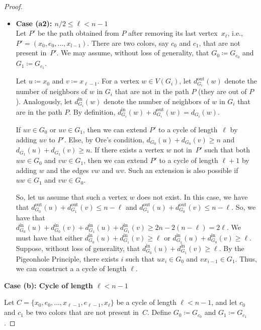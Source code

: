 \begin{proof}
\begin{itemize}
\item[] \textbf{Case (a2): \( n/2 \leq \ell < n-1 \)} \\ 


Let $P'$ be the path obtained from $P$ after removing its last vertex~$x_\ell$, i.e., $P' = (x_0, e_0, \dots, x_{l-1})$. There are two colors, say $c_0$ and $c_1$, that are not present
in~$P'$. We may assume, without loss of generality, that
\(G_0 \coloneqq G_{c_0}\) and \(G_1 \coloneqq G_{c_1}\).

Let
\(u \coloneqq x_0\) and \( v \coloneqq x_{\ell-1}\). 
% 
For a vertex $w\in V(G_i)$, let \( d^{\text{out}}_{G_i}(w)\) denote
the number of neighbors of \(w\) in $G_i$ that are not in the path $P$
(they are out of $P$).  Analogously, let \(d^{\text{in}}_{G_i}(w) \)
denote the number of neighbors of \(w\) in $G_i$ that are in the path
$P$.
%
By definition, \( d^{\text{in}}_{G_i}(w) + d^{\text{out}}_{G_i}(w) = d_{G_i}(w) \).

If \(uv \in G_0 \) or \( uv \in G_1 \), then we can extend $P'$ to a cycle of length~\( \ell \)
by adding $uv$ to $P'$.  Else, by Ore's condition, \( d_{G_0}(u) + d_{G_0}(v) \geq n \) and \( d_{G_1}(u) + d_{G_1}(v) \geq n \).
If there exists a vertex \(w\) not in~$P'$ such that both \(uw \in G_0 \) and \(vw \in G_1 \), 
then we can extend $P'$ to a  cycle of length \( \ell + 1 \) by adding $w$ and the edges $vw$ and $wv$.
Such an extension is also possible if \( uw \in G_1 \) and \( vw \in G_0 \).


So, let us assume that such a vertex \(w\) does not exist. In this case, we have that 
\( d^{\text{out}}_{G_0}(u) + d^{\text{out}}_{G_1}(v) \leq n - \ell \) and
\( d^{\text{out}}_{G_1}(u) + d^{\text{out}}_{G_0}(v) \leq n - \ell \). 
So, we have that \( d^{\text{in}}_{G_0}(u) + d^{\text{in}}_{G_0}(v) + 
d^{\text{in}}_{G_1}(u) + d^{\text{in}}_{G_1}(v)  \geq 2 n - 2 ( n - \ell  ) = 2 \ell \). We must have that 
either \( d^{\text{in}}_{G_0}(u) + d^{\text{in}}_{G_1}(v) \geq \ell \) or 
\( d^{\text{in}}_{G_1}(u) + d^{\text{in}}_{G_0}(v) \geq \ell \).
Suppose, without loss of generality, that \( d^{\text{in}}_{G_0}(u) + d^{\text{in}}_{G_1}(v) \geq \ell \).
By the Pigeonhole Principle, there exists \(i\) such that
\( ux_i \in G_0 \) and \(vx_{i-1} \in G_1 \). Thus, we can construct a
a cycle of length \( \ell \).


\end{itemize}


\ni \textbf{Case (b):  Cycle of length $\ell < n - 1$}

Let \( C = \{x_0, e_0, \dots, x_{\ell-1}, e_{\ell-1}, x_{\ell}\} \) be a cycle
of length \(\ell < n - 1 \), and let  $c_0$ and $c_1$ be two colors that
are not present in~$C$.  Define \(G_0 \coloneqq G_{c_0}\) and \(G_1 \coloneqq G_{c_1} \).


\end{proof}
